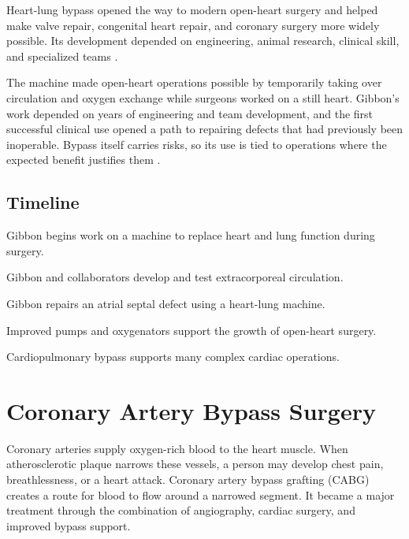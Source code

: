 \documentclass[12pt,oneside]{book}
\begin{document}
Heart-lung bypass opened the way to modern open-heart surgery and helped
make valve repair, congenital heart repair, and coronary surgery more
widely possible. Its development depended on engineering, animal research,
clinical skill, and specialized teams \cite{smithsonianGibbon}.

The machine made open-heart operations possible by temporarily taking over
circulation and oxygen exchange while surgeons worked on a still heart.
Gibbon’s work depended on years of engineering and team development, and the
first successful clinical use opened a path to repairing defects that had
previously been inoperable. Bypass itself carries risks, so its use is tied to
operations where the expected benefit justifies them
\cite{gibbonHeartLungMachine,smithsonianGibbon}.

\section*{Timeline}
\begin{description}[leftmargin=2.3cm,style=nextline]
  \item[1931] Gibbon begins work on a machine to replace heart and lung function during surgery.
  \item[1930s--1940s] Gibbon and collaborators develop and test extracorporeal circulation.
  \item[1953] Gibbon repairs an atrial septal defect using a heart-lung machine.
  \item[1950s onward] Improved pumps and oxygenators support the growth of open-heart surgery.
  \item[Today] Cardiopulmonary bypass supports many complex cardiac operations.
\end{description}
\chapter[Coronary Artery Bypass Surgery]{Coronary Artery Bypass Surgery}

Coronary arteries supply oxygen-rich blood to the heart muscle. When
atherosclerotic plaque narrows these vessels, a person may develop chest
pain, breathlessness, or a heart attack. Coronary artery bypass grafting
(CABG) creates a route for blood to flow around a narrowed segment. It
became a major treatment through the combination of angiography, cardiac
surgery, and improved bypass support.
\end{document}
